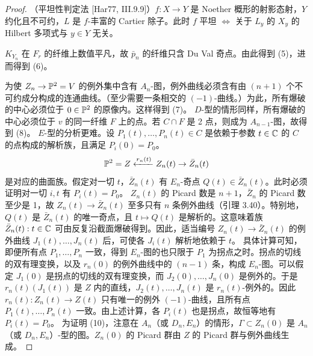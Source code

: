 \begin{proof}
\par\smallskip\noindent\hspace*{2em}（平坦性判定法 [Har77, III.9.9]）$f\colon X\to Y$ 是 Noether 概形的射影态射，$Y$ 约化且不可约，$L$ 是 $f$-丰富的 Cartier 除子。此时 $f$ 平坦 $\iff$ 关于 $L_y$ 的 $X_y$ 的 Hilbert 多项式与 $y\in Y$ 无关。

$K_{Y_n}$ 在 $F_r$ 的纤维上数值平凡，故 $\bar p_n$ 的纤维只含 Du Val 奇点。由此得到 (5)，进而得到 (6)。

为使 $Z_n\to\mathbb{P}^2=V$ 的例外集中含有 $A_n$-图，例外曲线必须含有由 $(n+1)$ 个不可约成分构成的连通曲线。（至少需要一条相交的 $(-1)$-曲线。）为此，所有爆破的中心必须位于 $0\in\mathbb{P}^2$ 的原像内。这样得到 (7)。
$D$-型的情形同样，所有爆破的中心必须位于 $v$ 的同一纤维 $F$ 上的点。若 $C\cap F$ 是 2 点，则成为 $A_{n-1}$-图，故得到 (8)。
$E$-型的分析更难。设 $P_1(t),\dots,P_n(t)\in C$ 是依赖于参数 $t\in\mathbb{C}$ 的 $C$ 的点构成的解析族，且满足 $P_i(0)=P_0$。
\[
\mathbb{P}^2=Z\xleftarrow{r_n(t)}Z_n(t)\to\bar Z_n(t)
\]
是对应的曲面族。假定对一切 $t$，$\bar Z_n(t)$ 有 $E_n$-奇点 $Q(t)\in\bar Z_n(t)$。此时必须证明对一切 $i,t$ 有 $P_i(t)=P_0$。
$Z_n(t)$ 的 Picard 数是 $n+1$，$\bar Z_n$ 的 Picard 数至少是 1，故 $Z_n(t)\to\bar Z_n(t)$ 至多只有 $n$ 条例外曲线（引理 3.40）。特别地，$Q(t)$ 是 $\bar Z_n(t)$ 的唯一奇点，且 $t\mapsto Q(t)$ 是解析的。这意味着族 $\bar Z_n(t):t\in\mathbb{C}$ 可由反复沿截面爆破得到。因此，适当编号 $Z_n(t)\to\bar Z_n(t)$ 的例外曲线 $J_1(t),\dots,J_n(t)$ 后，可使各 $J_i(t)$ 解析地依赖于 $t$。
具体计算可知，即便所有点 $P_1,\dots,P_n$ 一致，得到 $E_n$-图的也只限于 $P_1$ 为拐点之时。拐点的切线的双有理变换，以及 $r_n(0)$ 的例外曲线中的 $(n-1)$ 条，构成 $E_n$-图。可以假定 $J_1(0)$ 是拐点的切线的双有理变换，而 $J_2(0),\dots,J_n(0)$ 是例外的。于是 $r_n(t)(J_1(t))$ 是 $Z$ 内的直线，$J_2(t),\dots,J_n(t)$ 是 $r_n(t)$-例外的。因此 $r_n(t)\colon Z_n(t)\to Z(t)$ 只有唯一的例外 $(-1)$-曲线，且所有点 $P_1(t),\dots,P_n(t)$ 一致。由上述计算，各 $P_i(t)$ 也是拐点，故恒等地有 $P_i(t)=P_0$。
为证明 (10)，注意在 $A_n$（或 $D_n,E_n$）的情形，$\Gamma\subset Z_n(0)$ 是 $A_n$（或 $D_n,E_n$）-型的图。$Z_n(0)$ 的 Picard 群由 $Z$ 的 Picard 群与例外曲线生成。
\end{proof}


